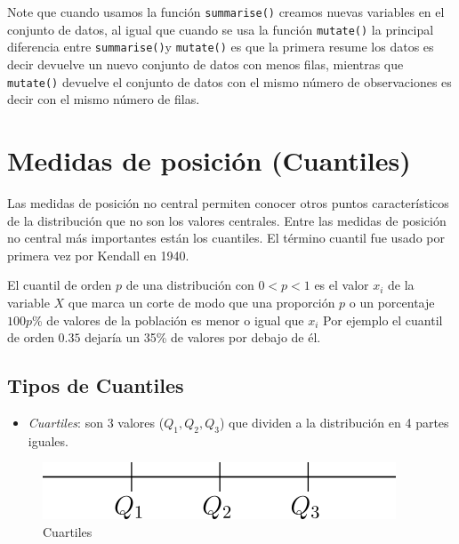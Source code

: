 \documentclass[letterpaper,]{book}
\providecommand{\tightlist}{%
  \setlength{\itemsep}{0pt}\setlength{\parskip}{0pt}}
\begin{document}
Note que cuando usamos la función \texttt{summarise()} creamos nuevas variables en el conjunto de datos, al igual que cuando se usa la función \texttt{mutate()} la principal diferencia entre \texttt{summarise()}y \texttt{mutate()} es que la primera resume los datos es decir devuelve un nuevo conjunto de datos con menos filas, mientras que \texttt{mutate()} devuelve el conjunto de datos con el mismo número de observaciones es decir con el mismo número de filas.

\hypertarget{medidas-de-posicion-cuantiles}{%
\section{Medidas de posición (Cuantiles)}\label{medidas-de-posicion-cuantiles}}

Las medidas de posición no central permiten conocer otros puntos característicos de la distribución que no son los valores centrales. Entre las medidas de posición no central más importantes están los cuantiles. El término cuantil fue usado por primera vez por Kendall en 1940.

El cuantil de orden \(p\) de una distribución con \(0<p<1\) es el valor \(x_{i}\) de la variable \(X\) que marca un corte de modo que una proporción \(p\) o un porcentaje \(100p\)\% de valores de la población es menor o igual que \(x_{i}\) Por ejemplo el cuantil de orden \(0.35\) dejaría un 35\% de valores por debajo de él.

\hypertarget{tipos-de-cuantiles}{%
\subsection{Tipos de Cuantiles}\label{tipos-de-cuantiles}}

\begin{itemize}
\tightlist
\item
  \emph{Cuartiles}: son 3 valores (\(Q_{1}, Q_{2}, Q_{3}\)) que dividen a la distribución en 4 partes iguales.
\end{itemize}

\begin{figure}[!h]

{\centering \includegraphics[width=0.5\linewidth]{cuartiles} 

}

\caption{Cuartiles}\label{fig:cuart}
\end{figure}
\end{document}

